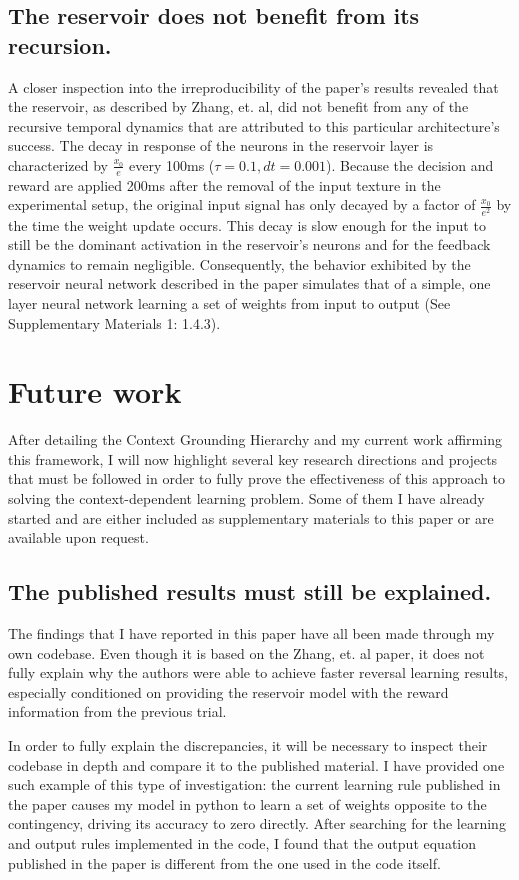 \documentclass[11pt]{article}
\begin{document}
\subsection{The reservoir does not benefit from its recursion.} \label{not_reservoir}
A closer inspection into the irreproducibility of the paper's results revealed that the reservoir, as described by Zhang, et. al, did not benefit from any of the recursive temporal dynamics that are attributed to this particular architecture's success.  The decay in response of the neurons in the reservoir layer is characterized by $\frac{x_0}{e}$ every 100ms ($\tau=0.1, dt=0.001$).  Because the decision and reward are applied 200ms after the removal of the input texture in the experimental setup, the original input signal has only decayed by a factor of $\frac{x_0}{e^2}$ by the time the weight update occurs.  This decay is slow enough for the input to still be the dominant activation in the reservoir's neurons and for the feedback dynamics to remain negligible.  Consequently, the behavior exhibited by the reservoir neural network described in the paper simulates that of a simple, one layer neural network learning a set of weights from input to output (See Supplementary Materials 1: 1.4.3).



\section{Future work}
After detailing the Context Grounding Hierarchy and my current work affirming this framework, I will now highlight several key research directions and projects that must be followed in order to fully prove the effectiveness of this approach to solving the context-dependent learning problem.  Some of them I have already started and are either included as supplementary materials to this paper or are available upon request.

\subsection{The published results must still be explained.}
The findings that I have reported in this paper have all been made through my own codebase.  Even though it is based on the Zhang, et. al paper, it does not fully explain why the authors were able to achieve faster reversal learning results, especially conditioned on providing the reservoir model with the reward information from the previous trial.

In order to fully explain the discrepancies, it will be necessary to inspect their codebase in depth and compare it to the published material.  I have provided one such example of this type of investigation: the current learning rule published in the paper causes my model in python to learn a set of weights opposite to the contingency, driving its accuracy to zero directly.  After searching for the learning and output rules implemented in the code, I found that the output equation published in the paper is different from the one used in the code itself.
\end{document}
